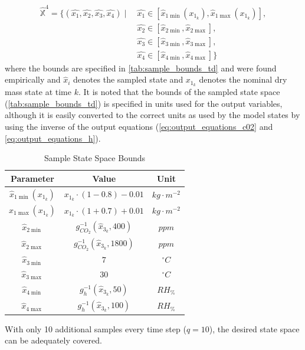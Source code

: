 \begin{equation}\label{eq:td_state_space}
\begin{split}
\hat{\mathbb{X}}^4 = \{ (\hat{x_1}, \hat{x_2}, \hat{x_3}, \hat{x_4}) \mid\ & \hat{x_1} \in [\hat{x}_{1\min}(x_{1_k}), \hat{x}_{1\max}(x_{1_k})], \\
& \hat{x_2} \in [\hat{x}_{2\min}, \hat{x}_{2\max}], \\
& \hat{x_3} \in [\hat{x}_{3\min}, \hat{x}_{3\max}], \\
& \hat{x_4} \in [\hat{x}_{4\min}, \hat{x}_{4\max}] \}
\end{split}
\end{equation}
where the bounds are specified in \autoref{tab:sample_bounds_td} and were found empirically and $\hat{x}_i$ denotes the sampled state and $x_{1_k}$ denotes the nominal dry mass state at time $k$. It is noted that the bounds of the sampled state space (\autoref{tab:sample_bounds_td}) is specified in units used for the output variables, although it is easily converted to the correct units as used by the model states by using the inverse of the output equations (\autoref{eq:output_equations_c02} and \autoref{eq:output_equations_h}).

\begin{table}[H]
	\centering
	\begin{tabular}{|c|c|c|}
		\hline
		\textbf{Parameter} & \textbf{Value} & \textbf{Unit} \\
		\hline
		$\hat{x}_{1\min}(x_{1_k})$ & $x_{1_k} \cdot (1 - 0.8) - 0.01$ & $kg \cdot m^{-2}$ \\
		$\hat{x}_{1\max}(x_{1_k})$ & $x_{1_k} \cdot (1 + 0.7) + 0.01$ & $kg \cdot m^{-2}$ \\
		$\hat{x}_{2\min}$ & $g_{CO_2}^{-1} (\hat{x}_{3_k}, 400)$ & $ppm$ \\
		$\hat{x}_{2\max}$ & $g_{CO_2}^{-1} (\hat{x}_{3_k}, 1800)$ & $ppm$ \\
		$\hat{x}_{3\min}$ & $7$ & $^\circ C$ \\
		$\hat{x}_{3\max}$ & $30$ & $^\circ C$ \\
		$\hat{x}_{4\min}$ & $g_{h}^{-1} (\hat{x}_{3_k}, 50)$ & $RH_{\%}$ \\
		$\hat{x}_{4\max}$ & $g_{h}^{-1} (\hat{x}_{3_k}, 100)$ & $RH_{\%}$ \\
		\hline
	\end{tabular}
	\caption{Sample State Space Bounds}
	\label{tab:sample_bounds_td}
\end{table}


With only 10 additional samples every time step ($q=10$), the desired state space can be adequately covered.

